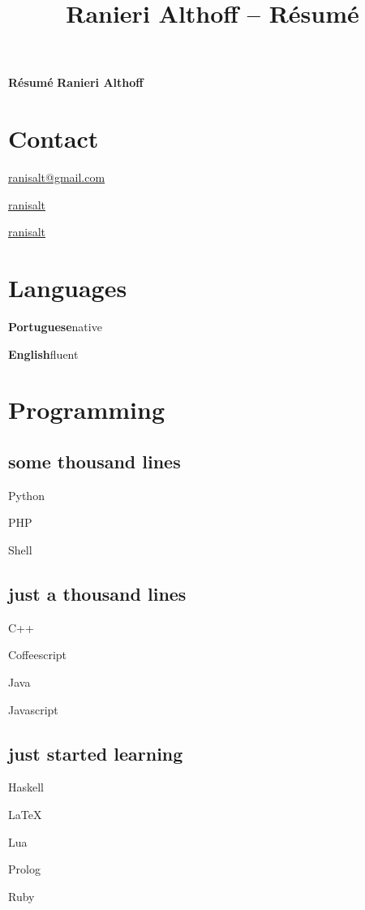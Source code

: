 \documentclass{article}
\newcommand{\contactentry}[2]{%
	\parbox{\textwidth}{\hfill #2 }
}
\newcommand{\languageentry}[2]{%
	\parbox{\textwidth}{\hfill \textbf{#1}\hspace{1em}#2}
}
\newenvironment{aside}{%
\noindent
\begin{minipage}[t]{\dimexpr0.25\textwidth}%
\begin{flushright}%
\let\oldsection\section
\let\oldsubsection\subsection
\renewcommand{\section}[1]{\oldsection*{##1}}
\renewcommand{\subsection}[1]{\oldsubsection*{\small ##1}\vspace{-0.5em}}
}{%
\let\subsection\oldsubsection
\let\section\oldsection
\end{flushright}%
\end{minipage}%
}
\begin{document}
 \selectfont

\title{Ranieri Althoff -- Résumé}

\noindent \Huge \textbf{Résumé} \hfill \textbf{Ranieri Althoff}
\normalsize \par
\vspace{\fill}

\begin{aside}
\section{Contact}
\contactentry{email}{\href{mailto:ranisalt+cv@gmail.com}{ranisalt@gmail.com}}
\contactentry{github}{\href{https://github.com/ranisalt}{ranisalt}}
\contactentry{twitter}{\href{https://twitter.com/ranisalt}{ranisalt}}


\section{Languages}
\languageentry{Portuguese}{native}
\languageentry{English}{fluent}


\section{Programming}
\center
\subsection{some thousand lines}
\begin{itemize*}
\item{Python}
\item{PHP}
\item{Shell}
\end{itemize*}

\subsection{just a thousand lines}
\begin{itemize*}
\item{C++}
\item{Coffeescript}
\item{Java}
\item{Javascript}
\end{itemize*}

\subsection{just started learning}
\begin{itemize*}
\item{Haskell}
\item{\LaTeX}
\item{Lua}
\item{Prolog}
\item{Ruby}
\end{itemize*}


\end{aside}
\end{document}
